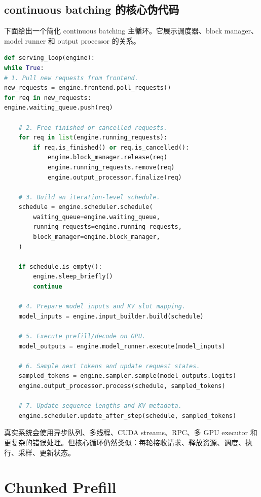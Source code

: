 \subsection{continuous batching 的核心伪代码}
\label{subsec:continuous-batching-pseudocode}

下面给出一个简化 continuous batching 主循环。它展示调度器、block manager、model runner 和 output processor 的关系。

\begin{lstlisting}[language=Python,caption={Continuous batching serving loop 的简化伪代码},label={lst:continuous-batching-main-loop}]
def serving_loop(engine):
while True:
# 1. Pull new requests from frontend.
new_requests = engine.frontend.poll_requests()
for req in new_requests:
engine.waiting_queue.push(req)

    # 2. Free finished or cancelled requests.
    for req in list(engine.running_requests):
        if req.is_finished() or req.is_cancelled():
            engine.block_manager.release(req)
            engine.running_requests.remove(req)
            engine.output_processor.finalize(req)

    # 3. Build an iteration-level schedule.
    schedule = engine.scheduler.schedule(
        waiting_queue=engine.waiting_queue,
        running_requests=engine.running_requests,
        block_manager=engine.block_manager,
    )

    if schedule.is_empty():
        engine.sleep_briefly()
        continue

    # 4. Prepare model inputs and KV slot mapping.
    model_inputs = engine.input_builder.build(schedule)

    # 5. Execute prefill/decode on GPU.
    model_outputs = engine.model_runner.execute(model_inputs)

    # 6. Sample next tokens and update request states.
    sampled_tokens = engine.sampler.sample(model_outputs.logits)
    engine.output_processor.process(schedule, sampled_tokens)

    # 7. Update sequence lengths and KV metadata.
    engine.scheduler.update_after_step(schedule, sampled_tokens)

\end{lstlisting}

真实系统会使用异步队列、多线程、CUDA streams、RPC、多 GPU executor 和更复杂的错误处理。但核心循环仍然类似：每轮接收请求、释放资源、调度、执行、采样、更新状态。

\section{Chunked Prefill}
\label{sec:chunked-prefill}

